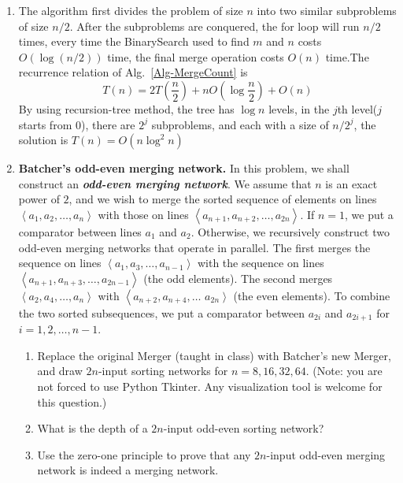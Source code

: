 \documentclass[12pt,a4paper]{article}
\makeatletter
\newtheorem*{solution}{Solution}
\theoremstyle{definition}
\renewenvironment{solution}[1][Solution] {\par\pushQED{\qed}\normalfont\topsep6\p@\@plus6\p@\relax\trivlist\item[\hskip\labelsep\bfseries#1\@addpunct{.}]\ignorespaces}{\popQED\endtrivlist\@endpefalse} \makeatother
\makeatother
\begin{document}
\begin{enumerate}
\begin{solution}
	The algorithm first divides the problem of size $n$ into two similar subproblems of size $n/2$. After the subproblems are conquered, the for loop will run $n/2$ times, every time the BinarySearch used to find $m$ and $n$ costs $O(\log (n/2))$ time, the final merge operation costs $O(n)$ time.The recurrence relation of Alg.~\ref{Alg-MergeCount} is $$T(n) = 2T(\frac{n}{2}) + nO(\log \frac{n}{2}) + O(n)$$
	By using recursion-tree method, the tree has $\log n$ levels, in the $j$th level($j$ starts from $0$), there are $2^{j}$ subproblems, and each with a size of $n/2^{j}$, the solution is $T(n) = O(n \log^{2}n)$
	\end{solution}
    \item
    \textbf{Batcher's odd-even merging network.} In this problem, we shall construct an \textbf{\textit{odd-even merging network}}. We assume that $n$ is an exact power of $2$, and we wish to merge the sorted sequence of elements on lines $\left\langle a_{1}, a_{2}, \ldots, a_{n}\right\rangle$ with those on lines $\left\langle a_{n+1}, a_{n+2}, \ldots, a_{2n}\right\rangle .$ If $n=1$, we put a comparator between lines $a_{1}$ and $a_{2}$. Otherwise, we recursively construct two odd-even merging networks that operate in parallel. The first merges the sequence on lines $\left\langle a_{1}, a_{3}, \ldots, a_{n-1}\right\rangle$ with the sequence on lines $\left\langle a_{n+1}, a_{n+3}, \ldots, a_{2n-1}\right\rangle$ (the
    odd elements). The second merges $\left\langle a_{2}, a_{4}, \ldots, a_{n}\right\rangle$ with $\left\langle a_{n+2}, a_{n+4}, \ldots\right.$
    $\left.a_{2n}\right\rangle$ (the even elements). To combine the two sorted subsequences, we put a comparator between $a_{2i}$ and $a_{2i+1}$ for $i=1,2, \ldots, n-1$.
    \begin{enumerate}
    	\item Replace the original Merger (taught in class) with Batcher's new Merger, and draw $2n$-input sorting networks for $n=8, 16, 32, 64$. {\color{blue}(Note: you are not forced to use Python Tkinter. Any visualization tool is welcome for this question.)}
    	
    	\item What is the depth of a $2n$-input odd-even sorting network?
    	
    	\item
    	{\color{red}{(Optional Sub-question with Bonus)}} Use the zero-one principle to prove that any $2n$-input odd-even merging network is indeed a merging network.
    	

\end{enumerate}
\end{enumerate}
\end{document}
